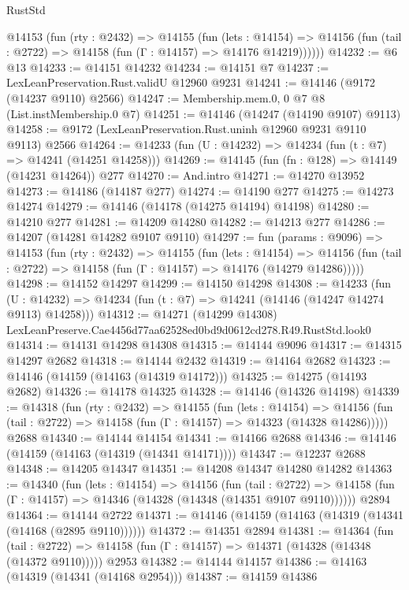 \begin{lexlean}{RustStd}
\begin{coremodule}
      @14153
        (fun (rty : @2432) =>
        @14155
          (fun (lets : @14154) =>
          @14156 (fun (tail : @2722) => @14158 (fun (Γ : @14157) => @14176 @14219))))))
@14232 := @6 @13
@14233 := @14151 @14232
@14234 := @14151 @7
@14237 := LexLeanPreservation.Rust.validU @12960 @9231
@14241 := @14146 (@9172 (@14237 @9110) @2566)
@14247 := Membership.mem.{0, 0} @7 @8 (List.instMembership.{0} @7)
@14251 := @14146 (@14247 (@14190 @9107) @9113)
@14258 := @9172 (LexLeanPreservation.Rust.uninh @12960 @9231 @9110 @9113) @2566
@14264 := @14233 (fun (U : @14232) => @14234 (fun (t : @7) => @14241 (@14251 @14258)))
@14269 := @14145 (fun (fn : @128) => @14149 (@14231 @14264)) @277
@14270 := And.intro
@14271 := @14270 @13952
@14273 := @14186 (@14187 @277)
@14274 := @14190 @277
@14275 := @14273 @14274
@14279 := @14146 (@14178 (@14275 @14194) @14198)
@14280 := @14210 @277
@14281 := @14209 @14280
@14282 := @14213 @277
@14286 := @14207 (@14281 @14282 @9107 @9110)
@14297 := fun (params : @9096) =>
  @14153
    (fun (rty : @2432) =>
    @14155
      (fun (lets : @14154) =>
      @14156 (fun (tail : @2722) => @14158 (fun (Γ : @14157) => @14176 (@14279 @14286)))))
@14298 := @14152 @14297
@14299 := @14150 @14298
@14308 := @14233
    (fun (U : @14232) => @14234 (fun (t : @7) => @14241 (@14146 (@14247 @14274 @9113) @14258)))
@14312 := @14271 (@14299 @14308) LexLeanPreserve.Cae4456d77aa62528ed0bd9d0612cd278.R49.RustStd.look0
@14314 := @14131 @14298 @14308
@14315 := @14144 @9096
@14317 := @14315 @14297 @2682
@14318 := @14144 @2432
@14319 := @14164 @2682
@14323 := @14146 (@14159 (@14163 (@14319 @14172)))
@14325 := @14275 (@14193 @2682)
@14326 := @14178 @14325
@14328 := @14146 (@14326 @14198)
@14339 := @14318
    (fun (rty : @2432) =>
    @14155
      (fun (lets : @14154) =>
      @14156 (fun (tail : @2722) => @14158 (fun (Γ : @14157) => @14323 (@14328 @14286)))))
    @2688
@14340 := @14144 @14154
@14341 := @14166 @2688
@14346 := @14146 (@14159 (@14163 (@14319 (@14341 @14171))))
@14347 := @12237 @2688
@14348 := @14205 @14347
@14351 := @14208 @14347 @14280 @14282
@14363 := @14340
    (fun (lets : @14154) =>
    @14156
      (fun (tail : @2722) =>
      @14158 (fun (Γ : @14157) => @14346 (@14328 (@14348 (@14351 @9107 @9110))))))
    @2894
@14364 := @14144 @2722
@14371 := @14146 (@14159 (@14163 (@14319 (@14341 (@14168 (@2895 @9110))))))
@14372 := @14351 @2894
@14381 := @14364
    (fun (tail : @2722) => @14158 (fun (Γ : @14157) => @14371 (@14328 (@14348 (@14372 @9110)))))
    @2953
@14382 := @14144 @14157
@14386 := @14163 (@14319 (@14341 (@14168 @2954)))
@14387 := @14159 @14386

\end{coremodule}
\end{lexlean}

